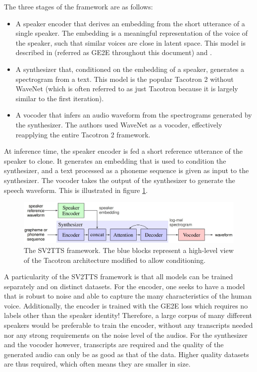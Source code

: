\documentclass[a4paper, oneside, 12pt, english]{article}
\begin{document}
The three stages of the framework are as follows:
\begin{itemize}
	\item A speaker encoder that derives an embedding from the short utterance of a single speaker. The embedding is a meaningful representation of the voice of the speaker, such that similar voices are close in latent space. This model is described in \citep{GE2E} (referred as GE2E throughout this document) and \citep{TE2E}.
	\item A synthesizer that, conditioned on the embedding of a speaker, generates a spectrogram from a text. This model is the popular Tacotron 2 \citep{Tacotron2} without WaveNet (which is often referred to as just Tacotron because it is largely similar to the first iteration).
	\item A vocoder that infers an audio waveform from the spectrograms generated by the synthesizer. The authors used WaveNet \citep{WaveNet} as a vocoder, effectively reapplying the entire Tacotron 2 framework.
\end{itemize}
At inference time, the speaker encoder is fed a short reference utterance of the speaker to clone. It generates an embedding that is used to condition the synthesizer, and a text processed as a phoneme sequence is given as input to the synthesizer. The vocoder takes the output of the synthesizer to generate the speech waveform. This is illustrated in figure \ref{sv2tts_framework}.

\begin{figure}[h]
	\centering
	\includegraphics[width=\linewidth]{images/sv2tts_framework.jpg}
	\caption{The SV2TTS framework. The blue blocks represent a high-level view of the Tacotron architecture modified to allow conditioning.}
	\label{sv2tts_framework}
\end{figure}

A particularity of the SV2TTS framework is that all models can be trained separately and on distinct datasets. For the encoder, one seeks to have a model that is robust to noise and able to capture the many characteristics of the human voice. Additionally, the encoder is trained with the GE2E loss which requires no labels other than the speaker identity! Therefore, a large corpus of many different speakers would be preferable to train the encoder, without any transcripts needed nor any strong requirements on the noise level of the audios. For the synthesizer and the vocoder however, transcripts are required and the quality of the generated audio can only be as good as that of the data. Higher quality datasets are thus required, which often means they are smaller in size.
\end{document}
